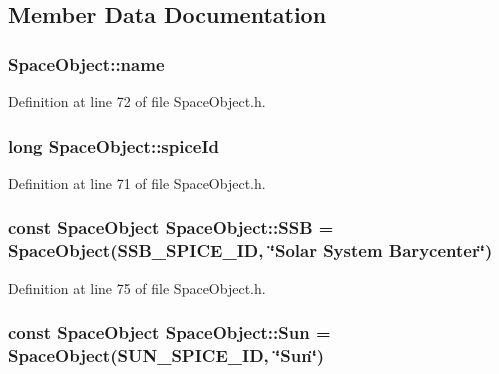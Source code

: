 \subsection{Member Data Documentation}
\hypertarget{class_space_object_a6af735f50cde4bb709c82c07d2332c73}{
\subsubsection[{name}]{ Space\+Object\+::name\hspace{0.3cm}{\ttfamily [protected]}}}\label{class_space_object_a6af735f50cde4bb709c82c07d2332c73}


Definition at line 72 of file Space\+Object.\+h.

\hypertarget{class_space_object_a841dd12234c1861d3c1978035c9d7b8d}{
\subsubsection[{spice\+Id}]{\setlength{\rightskip}{0pt plus 5cm}long Space\+Object\+::spice\+Id\hspace{0.3cm}{\ttfamily [protected]}}}\label{class_space_object_a841dd12234c1861d3c1978035c9d7b8d}


Definition at line 71 of file Space\+Object.\+h.

\hypertarget{class_space_object_a2f4df46723472a248a030275dbfba9bb}{
\subsubsection[{S\+S\+B}]{\setlength{\rightskip}{0pt plus 5cm}const {\bf Space\+Object} Space\+Object\+::\+S\+S\+B = {\bf Space\+Object}({\bf S\+S\+B\+\_\+\+S\+P\+I\+C\+E\+\_\+\+I\+D}, \char`\"{}Solar System Barycenter\char`\"{})\hspace{0.3cm}{\ttfamily [static]}}}\label{class_space_object_a2f4df46723472a248a030275dbfba9bb}


Definition at line 75 of file Space\+Object.\+h.

\hypertarget{class_space_object_ad047dd22e8dc1ea15bc740d879cde226}{
\subsubsection[{Sun}]{\setlength{\rightskip}{0pt plus 5cm}const {\bf Space\+Object} Space\+Object\+::\+Sun = {\bf Space\+Object}({\bf S\+U\+N\+\_\+\+S\+P\+I\+C\+E\+\_\+\+I\+D}, \char`\"{}Sun\char`\"{})\hspace{0.3cm}{\ttfamily [static]}}}\label{class_space_object_ad047dd22e8dc1ea15bc740d879cde226}


